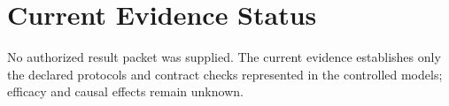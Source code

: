 \section{Current Evidence Status}

No authorized result packet was supplied. The current evidence establishes only the declared protocols and contract checks represented in the controlled models; efficacy and causal effects remain unknown.
